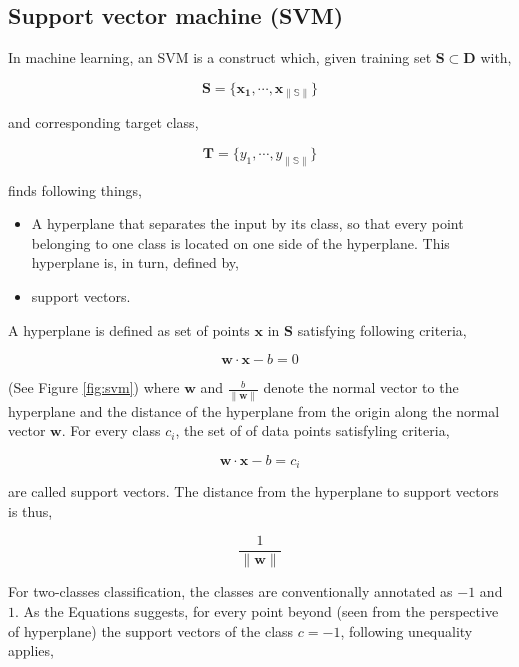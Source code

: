 \documentclass[pdftex,12pt,a4paper]{report}
\begin{document}
\subsection{Support vector machine (SVM)}
\label{subsection:svm}

In machine learning, an SVM is a construct which, given training set $\mathbf{S} \subset \mathbf{D}$ with,

$$
\mathbf{S} = \{\mathbf{x_1}, \cdots, \mathbf{x}_{\|\mathbb{S}\|}\}
$$

and corresponding target class,

$$
\mathbf{T} = \{y_1, \cdots, y_{\|\mathbb{S}\|}\}
$$

finds following things,

\begin{itemize}
\item A hyperplane that separates the input by its class, so that every point belonging to one class is located on one side of the hyperplane. This hyperplane is, in turn, defined by,
\item support vectors.
\end{itemize}

A hyperplane is defined as set of points $\mathbf{x}$ in $\mathbf{S}$ satisfying following criteria,

\begin{equation}
\mathbf{w} \cdot \mathbf{x} - b = 0
\label{equation:hyperplane}
\end{equation}

(See Figure \ref{fig:svm}) where $\mathbf{w}$ and $\frac{b}{\| \mathbf{w} \|}$ denote the normal vector to the hyperplane and the distance of the hyperplane from the origin along the normal vector $\mathbf{w}$. For every class $c_i$, the set of of data points satisfyling criteria,

\begin{equation}
\mathbf{w} \cdot \mathbf{x} - b = c_i
\label{equation:support_vector}
\end{equation}

are called support vectors. The distance from the hyperplane to support vectors is thus,

$$\frac{1}{\| \mathbf{w} \|}$$

For two-classes classification, the classes are conventionally annotated as $-1$ and $1$. As the Equations \label{equation:support_vector} suggests, for every point beyond (seen from the perspective of hyperplane) the support vectors of the class $c = -1$, following unequality applies,
\end{document}
